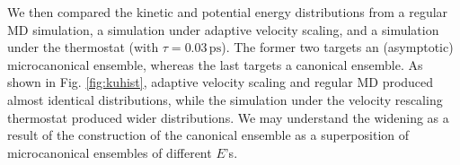 \documentclass[reprint]{revtex4-1}
\newcommand{\note}[1]{{\color{DarkGreen}\footnotesize \textsc{Note.} #1}}
\begin{document}



We then compared the kinetic and potential energy
distributions from a regular MD simulation,
a simulation under adaptive velocity scaling,
and
a simulation under the %
thermostat\cite{bussi2007}
(with $\tau = 0.03 \, \mathrm{ps}$).
%
The former two targets an (asymptotic) microcanonical ensemble,
whereas the last targets a canonical ensemble.
%
As shown in Fig. \ref{fig:kuhist},
adaptive velocity scaling and regular MD
produced almost identical distributions,
while the simulation under the velocity rescaling thermostat
produced wider distributions.
%
We may understand the widening %
as a result of the construction of the canonical ensemble
as a superposition of microcanonical ensembles of different $E$'s.
%
%
\end{document}
